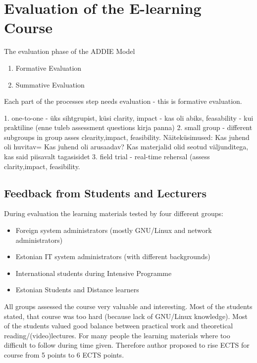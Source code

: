 \chapter{Evaluation of the E-learning Course}
\label{Evaluation of the E-learning Course}

The evaluation phase of the ADDIE Model
\begin{enumerate}
\item Formative Evaluation
\item Summative Evaluation
\end{enumerate}

Each part of the processes step needs evaluation - this is formative evaluation.

1. one-to-one - üks sihtgrupist, küsi clarity, impact - kas oli abiks, feasability - kui praktiline (enne tuleb assessment questions kirja panna)
2. small group  - different subgroups in group asses clearity,impact, feasibility. Näiteküsimused: Kas juhend oli huvitav= Kas juhend oli arusaadav? Kas materjalid olid seotud väljunditega, kas said piisavalt tagasisidet
3. field trial -  real-time rehersal (assess clarity,impact, feasibility.


\section{Feedback from Students and Lecturers}

During evaluation the learning materials tested by four different groups:

\begin{itemize}
\item Foreign system administrators (mostly GNU/Linux and network administrators)
\item Estonian IT system administrators (with different backgrounds)
\item International students during Intensive Programme
\item Estonian Students and Distance learners
\end{itemize}


All groups assessed the course very valuable and interesting. Most of the students stated, that course was too hard (because lack of GNU/Linux knowledge). Most of the students valued good balance between practical work and theoretical reading/(video)lectures. For many people the learning materials where too difficult to follow during time given. Therefore author proposed to rise \gls{ECTS} for course from 5 points  to 6 \gls{ECTS} points.



